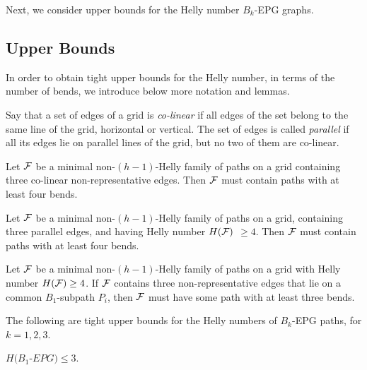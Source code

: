 Next, we consider upper bounds for the Helly number $B_k$-EPG graphs.

\subsection{Upper Bounds}\label{subsec-upper}

In order to obtain tight upper bounds for the Helly number, in terms of the number of bends, we introduce below more notation and lemmas.

Say that a set of edges of a grid is {\it co-linear} if all edges of the set belong to the same line of the grid, horizontal or vertical. The set of edges is called {\it parallel} if all its edges lie on parallel lines of the grid, but no two of them are co-linear.  


\begin{lemma}
\label{lemma:3colin}
Let $\cal {F}$ be a minimal non-$(h-1)$-Helly family of paths on a grid containing three co-linear non-representative edges. Then $\cal{F}$ must contain paths with at least four bends.
\end{lemma}



\begin{lemma}
\label{lemma:3par}
Let $\cal{F}$ be a minimal non-$(h-1)$-Helly family of paths on a grid, containing three parallel edges, and having  Helly number $H(\cal{F})$   $\geq 4$. Then $\cal{F}$ must contain paths with at least four bends. 
\end{lemma}


\begin{lemma} \label{lemma:Lwit}
Let $\cal{F}$ be a minimal non-$(h-1)$-Helly family of paths on a grid with  Helly number $H({\cal F}) \geq 4$. If ${\cal F}$ contains three non-representative edges that lie on a common $B_1$-subpath $P_i$, then $\cal {F}$ must have some path with at least three bends. \end{lemma}


The following are tight upper bounds for the Helly numbers of $B_k$-EPG paths, for $k = 1,2,3$.

\begin{claim}\label{claim:upper-B1}
$H(B_1$-$EPG) \leq 3.$
\end{claim}
 

